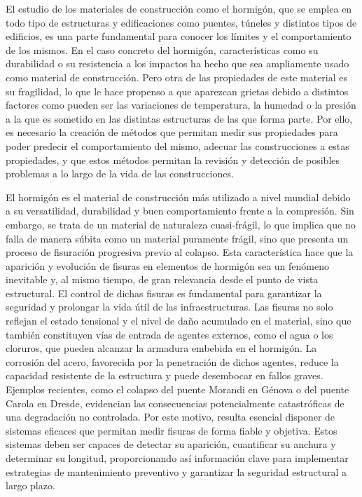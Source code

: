 
El estudio de los materiales de construcción como el hormigón, que se emplea en todo tipo de estructuras y edificaciones como puentes, túneles y distintos tipos de edificios, es una parte fundamental para conocer los límites y el comportamiento de los mismos. En el caso concreto del hormigón, características como su  durabilidad o su resistencia a los impactos ha hecho que sea ampliamente usado como material de construcción. Pero otra de las propiedades de este material es su fragilidad, lo que le hace propenso a que aparezcan grietas debido a distintos factores como pueden ser las variaciones de temperatura, la humedad o la presión a la que es sometido en las distintas estructuras de las que forma parte. \cite{Zhang2024Review} Por ello, es necesario la creación de métodos que permitan medir sus propiedades para poder predecir el comportamiento del mismo, adecuar las construcciones a estas propiedades, y que estos métodos permitan la revisión y detección de posibles problemas a lo largo de la vida de las construcciones.

El hormigón es el material de construcción más utilizado a nivel mundial debido a su versatilidad, durabilidad y buen comportamiento frente a la compresión. Sin embargo, se trata de un material de naturaleza cuasi-frágil, lo que implica que no falla de manera súbita como un material puramente frágil, sino que presenta un proceso de fisuración progresiva previo al colapso. Esta característica hace que la aparición y evolución de fisuras en elementos de hormigón sea un fenómeno inevitable y, al mismo tiempo, de gran relevancia desde el punto de vista estructural. El control de dichas fisuras es fundamental para garantizar la seguridad y prolongar la vida útil de las infraestructuras. Las fisuras no solo reflejan el estado tensional y el nivel de daño acumulado en el material, sino que también constituyen vías de entrada de agentes externos, como el agua o los cloruros, que pueden alcanzar la armadura embebida en el hormigón. La corrosión del acero, favorecida por la penetración de dichos agentes, reduce la capacidad resistente de la estructura y puede desembocar en fallos graves. Ejemplos recientes, como el colapso del puente Morandi en Génova o del puente Carola en Dresde, evidencian las consecuencias potencialmente catastróficas de una degradación no controlada. Por este motivo, resulta esencial disponer de sistemas eficaces que permitan medir fisuras de forma fiable y objetiva. Estos sistemas deben ser capaces de detectar su aparición, cuantificar su anchura y determinar su longitud, proporcionando así información clave para implementar estrategias de mantenimiento preventivo y garantizar la seguridad estructural a largo plazo.

